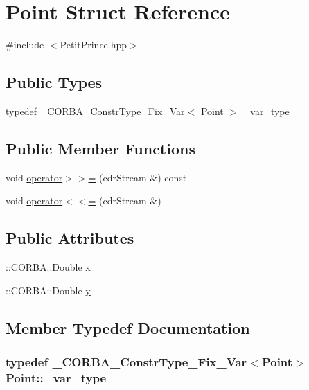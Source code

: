 \hypertarget{struct_point}{}\section{Point Struct Reference}
\label{struct_point}


{\ttfamily \#include $<$Petit\+Prince.\+hpp$>$}

\subsection*{Public Types}
\begin{DoxyCompactItemize}
\item 
typedef \+\_\+\+C\+O\+R\+B\+A\+\_\+\+Constr\+Type\+\_\+\+Fix\+\_\+\+Var$<$ \hyperlink{struct_point}{Point} $>$ \hyperlink{struct_point_ac0f868b3927103f07a654f80d55c34f0}{\+\_\+var\+\_\+type}
\end{DoxyCompactItemize}
\subsection*{Public Member Functions}
\begin{DoxyCompactItemize}
\item 
void \hyperlink{struct_point_a4e7b7000256a34f67d026218d556fadd}{operator$>$$>$=} (cdr\+Stream \&) const 
\item 
void \hyperlink{struct_point_aa1ab4ca56cba78a75f4dc163d33c3a68}{operator$<$$<$=} (cdr\+Stream \&)
\end{DoxyCompactItemize}
\subsection*{Public Attributes}
\begin{DoxyCompactItemize}
\item 
\+::C\+O\+R\+B\+A\+::\+Double \hyperlink{struct_point_a3af32dd2ea10a8184bedd984a831b295}{x}
\item 
\+::C\+O\+R\+B\+A\+::\+Double \hyperlink{struct_point_a059294d7a3980780c3e2d6c74b4197fb}{y}
\end{DoxyCompactItemize}


\subsection{Member Typedef Documentation}
\subsubsection[{\texorpdfstring{\+\_\+var\+\_\+type}{_var_type}}]{\setlength{\rightskip}{0pt plus 5cm}typedef \+\_\+\+C\+O\+R\+B\+A\+\_\+\+Constr\+Type\+\_\+\+Fix\+\_\+\+Var$<${\bf Point}$>$ {\bf Point\+::\+\_\+var\+\_\+type}}\hypertarget{struct_point_ac0f868b3927103f07a654f80d55c34f0}{}\label{struct_point_ac0f868b3927103f07a654f80d55c34f0}


